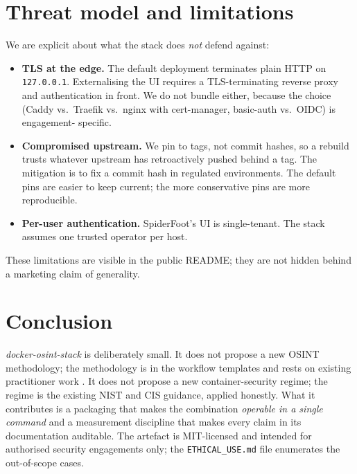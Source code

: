 \documentclass[conference,a4paper,10pt]{IEEEtran}
\begin{document}
\section{Threat model and limitations}

We are explicit about what the stack does \emph{not} defend against:

\begin{itemize}
  \item \textbf{TLS at the edge.} The default deployment terminates
    plain HTTP on \texttt{127.0.0.1}. Externalising the UI requires a
    TLS-terminating reverse proxy and authentication in front. We do
    not bundle either, because the choice (Caddy vs.\ Traefik vs.\
    nginx with cert-manager, basic-auth vs.\ OIDC) is engagement-
    specific.
  \item \textbf{Compromised upstream.} We pin to tags, not commit
    hashes, so a rebuild trusts whatever upstream has retroactively
    pushed behind a tag. The mitigation is to fix a commit hash in
    regulated environments. The default pins are easier to keep
    current; the more conservative pins are more reproducible.
  \item \textbf{Per-user authentication.} SpiderFoot's UI is
    single-tenant. The stack assumes one trusted operator per host.
\end{itemize}

These limitations are visible in the public README; they are not
hidden behind a marketing claim of generality.

\section{Conclusion}

\emph{docker-osint-stack} is deliberately small. It does not propose
a new OSINT methodology; the methodology is in the workflow templates
and rests on existing practitioner work \cite{bazzell2023,heuer1999}.
It does not propose a new container-security regime; the regime is
the existing NIST \cite{nist800190} and CIS \cite{cisdocker} guidance,
applied honestly. What it contributes is a packaging that makes the
combination \emph{operable in a single command} and a measurement
discipline that makes every claim in its documentation auditable.
The artefact is MIT-licensed and intended for authorised security
engagements only; the \texttt{ETHICAL\_USE.md} file enumerates the
out-of-scope cases.
\end{document}

